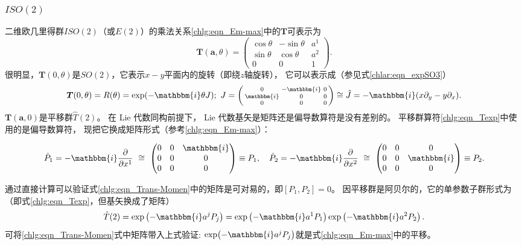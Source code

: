 \subsubsection{$ISO(2)$}\label{chlg:sec_e2}
二维欧几里得群$ISO(2)$（或$E(2)$）的乘法关系\eqref{chlg:eqn_Em-max}中的$\boldsymbol{T}$可表示为
\begin{equation}
    \boldsymbol{T}( \boldsymbol{a}, \theta ) =  \begin{pmatrix}
        {\cos \theta }&{ - \sin \theta }& a^1 \\
        {\sin \theta }&{\cos \theta }& a^2 \\
        0&0&1
    \end{pmatrix} .
\end{equation}
很明显，$\boldsymbol{T}( 0, \theta )$是$SO(2)$，它表示$x-y$平面内的旋转（即绕$z$轴旋转），
它可以表示成（参见式\eqref{chlar:eqn_expSO3}）
\begin{equation}\label{chlg:eqn_tmpR}
    \boldsymbol{T}( 0, \theta )= R(\theta ) =\exp(-\mathbbm{i} \theta J); \
    J = \left(\begin{smallmatrix}
        0 & -\mathbbm{i} & 0 \\
        \mathbbm{i} & 0 & 0 \\
        0 & 0 & 0
    \end{smallmatrix} \right)\cong
    \hat{J} = -\mathbbm{i} (x \partial_y - y \partial_x ).
\end{equation}
$\boldsymbol{T}( \boldsymbol{a}, 0 )$是平移群$\hat{T}(2)$。
在 Lie 代数同构前提下， Lie 代数基矢是矩阵还是偏导数算符是没有差别的。
平移群算符\eqref{chlg:eqn_Texp}中使用的是偏导数算符，
现把它换成矩阵形式（参考\eqref{chlg:eqn_Em-max}）：
\begin{small}
\begin{equation}\label{chlg:eqn_Trans-Momen}
    \hat{P}_1 = -\mathbbm{i}\frac{\partial }{\partial x^1}  \ \cong \  
    \begin{pmatrix}
        0 & 0 & \mathbbm{i} \\
        0 & 0 & 0 \\
        0 & 0 & 0
    \end{pmatrix}\equiv P_1,\quad
    \hat{P}_2 = -\mathbbm{i}\frac{\partial }{\partial x^2}  \ \cong \  
    \begin{pmatrix}
        0 & 0 & 0 \\
        0 & 0 & \mathbbm{i} \\
        0 & 0 & 0
    \end{pmatrix} \equiv P_2.
\end{equation}
\end{small}
通过直接计算可以验证式\eqref{chlg:eqn_Trans-Momen}中的矩阵是可对易的，即$[P_1,P_2]=0$。
因平移群是阿贝尔的，它的单参数子群形式为（即式\eqref{chlg:eqn_Texp}，但基矢换成了矩阵）
\begin{equation}
    \hat{T}(2) = \exp\left( -\mathbbm{i} a^j P_j \right) 
    = \exp\left(-\mathbbm{i} a^1 P_1  \right)  \exp\left(-\mathbbm{i} a^2 P_2 \right)  .
\end{equation}
可将\eqref{chlg:eqn_Trans-Momen}式中矩阵带入上式验证:
$\exp(-\mathbbm{i} a^j P_j)$就是式\eqref{chlg:eqn_Em-max}中的平移。

